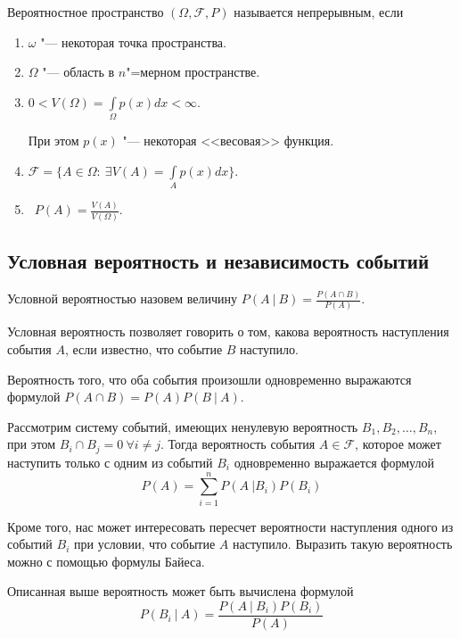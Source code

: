 \begin{definition}
    Вероятностное пространство $(\Omega, \mathcal{F}, P)$ называется непрерывным,
    если 
    \begin{enumerate}
        \item $\omega$ "--- некоторая точка пространства.
        \item $\Omega$ "--- область в $n$"=мерном пространстве.
        \item $0 < V(\Omega) = \int\limits_{\Omega}p(x)dx < \infty$.
    
    При этом $p(x)$ "--- некоторая <<весовая>> функция.
    \item $\mathcal{F} = \{A \in \Omega: ~ \exists V(A) = \int\limits_{A}p(x)dx\}$.
    \item  $\displaystyle P(A) = \frac{V(A)}{V(\Omega)}$.
    \end{enumerate}
\end{definition}
\subsection{Условная вероятность и независимость событий}

\begin{definition}
    Условной вероятностью назовем величину $\displaystyle P(A ~|~ B) = \frac{P(A \cap B)}{P(A)}$.
\end{definition}
Условная вероятность позволяет говорить о том, какова вероятность наступления
события $A$, если известно, что событие $B$ наступило.

\begin{theorem}
    Вероятность того, что оба события произошли одновременно выражаются формулой
    $P(A \cap B) = P(A) P(B ~|~ A)$.
\end{theorem}

\begin{theorem}
    Рассмотрим систему событий, имеющих ненулевую вероятность $B_1, B_2, \dots, B_n$, при этом
    $B_i \cap B_j = 0 ~ \forall i \neq j$. Тогда вероятность
    события $A \in \mathcal{F}$, которое может наступить только
    с одним из событий $B_i$ одновременно выражается формулой
    \begin{equation}
        P(A) = \sum\limits_{i = 1}^n P(A ~| B_i) P(B_i)
    \end{equation}
\end{theorem}

Кроме того, нас может интересовать пересчет вероятности наступления
одного из событий $B_i$ при условии, что событие $A$ наступило.
Выразить такую вероятность можно с помощью формулы Байеса.
\begin{theorem}
    Описанная выше вероятность может быть вычислена формулой
    \begin{equation}
        P(B_i ~|~ A) = \frac{P(A ~|~ B_i)P(B_i)}{P(A)}
    \end{equation}
\end{theorem}

